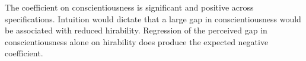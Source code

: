 \documentclass[review]{elsarticle}
\begin{document}
The coefficient on conscientiousness is significant and positive across specifications.
Intuition would dictate that a large gap in conscientiousness would be associated with reduced hirability.
Regression of the perceived gap in conscientiousness alone on hirability does produce the expected negative coefficient.
%
%
\end{document}
